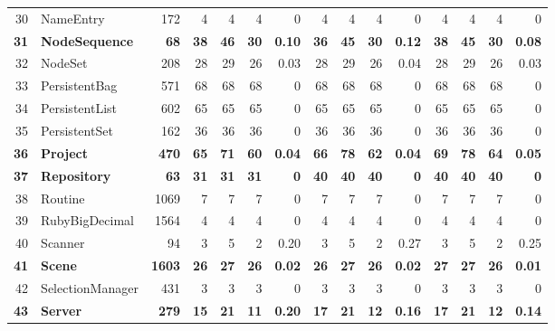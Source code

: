 \begin{table} [htp!]
{\begin{tabularx}{1 \textwidth}{r l r r r r r r r r r r r r r}
30						& NameEntry				&172		& 4		&	4	&	4	& 	0					& 4		& 4 		& 4		& 		0			& 4			& 4			& 4			&	0	\\  
\textbf{31}						& \textbf{NodeSequence}			&\textbf{68}			& \textbf{38}		&	\textbf{46}	&	\textbf{30}	& 	\textbf{0.10}					& \textbf{36}		& \textbf{45} 		& \textbf{30}		& 		\textbf{0.12}			& \textbf{38}			& \textbf{45}			& \textbf{30}			&	\textbf{0.08}	\\     
32						& NodeSet				&208		& 28		&	29	&	26	& 	0.03					& 28		& 29 		& 26		& 		0.04			& 28			& 29			& 26			&	0.03	\\  
33						& PersistentBag			&571		& 68		&	68	&	68	& 	0					& 68		&  68		& 68		& 		0			& 68			& 68			& 68			&	0	\\         
34						& PersistentList				&602		& 65		&	65	&	65	& 	0					& 65		&  65		& 65		& 		0			& 65			& 65			& 65			&	0	\\    
35						& PersistentSet				&162		& 36		&	36	&	36	& 	0					& 36		&  36		& 36		& 		0			& 36			& 36			& 36 			&	0	\\        
\textbf{36}						& \textbf{Project}					&\textbf{470}		& \textbf{65}		&	\textbf{71}	&	\textbf{60}	& 	\textbf{0.04}					& \textbf{66}		&  \textbf{78}		& \textbf{62}		& 		\textbf{0.04}			& \textbf{69}			& \textbf{78}			& \textbf{64}			&	\textbf{0.05}	\\        
\textbf{37}						& \textbf{Repository}				&\textbf{63}			& \textbf{31}		&	\textbf{31}	&	\textbf{31}	& 	\textbf{0}					& \textbf{40}		&  \textbf{40}		& \textbf{40}		& 		\textbf{0}			& \textbf{40}			& \textbf{40}			& \textbf{40}			&	\textbf{0}	\\         
38						& Routine					&1069		& 7		&	7	&	7	& 	0					& 7		&  7		& 7		& 		0			& 7			& 7			& 7			&	0	\\
39						& RubyBigDecimal			&1564		& 4 		&	4	&	4	& 	0					& 4		& 4 		& 4		& 		0			& 4			& 4			& 4			&	0\\      
40						& Scanner				&94			& 3		&	5	&	2	& 	0.20					& 3		& 5 		& 2		& 		0.27			& 3			& 5			& 2			&	0.25\\      
\textbf{41}						& \textbf{Scene}					&\textbf{1603}		& \textbf{26}		&	\textbf{27}	&	\textbf{26}	& 	\textbf{0.02}					& \textbf{26}		& \textbf{27} 		& \textbf{26}		& 		\textbf{0.02}			& \textbf{27}			& \textbf{27}			& \textbf{26}			&	\textbf{0.01}\\      
42						& SelectionManager			&431		& 3		&	3	&	3	& 	0					& 3		& 3 		& 3		& 		0			& 3			& 3			& 3			&	0\\      
\textbf{43}						& \textbf{Server}					&\textbf{279}		&\textbf{15}		&	\textbf{21}	&	\textbf{11}	& 	\textbf{0.20}					& \textbf{17}		& \textbf{21} 		& \textbf{12}		& 		\textbf{0.16}			& \textbf{17}			& \textbf{21}			& \textbf{12}			&	\textbf{0.14}\\      

\end{tabularx}}
\end{table}
